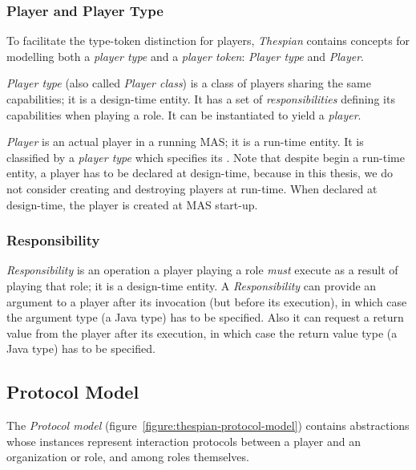 \subsubsection*{Player and Player Type}

To facilitate the type-token distinction for players, \textit{Thespian} contains concepts for modelling both a \textit{player type} and a \textit{player token}: \textit{Player type} and \textit{Player}.

\textit{Player type} (also called \textit{Player class}) is a class of players sharing the same capabilities; it is a design-time entity.
It has a set of \textit{responsibilities} defining its capabilities when playing a role.
It can be instantiated to yield a \textit{player}.

\textit{Player} is an actual player in a running MAS; it is a run-time entity.
It is classified by a \textit{player type} which specifies its .
Note that despite begin a run-time entity, a player has to be declared at design-time, because in this thesis, we do not consider creating and destroying players at run-time.
When declared at design-time, the player is created at MAS start-up.

\subsubsection*{Responsibility}

\textit{Responsibility} is an operation a player playing a role \textit{must} execute as a result of playing that role; it is a design-time entity.
A \textit{Responsibility} can provide an argument to a player after its invocation (but before its execution), in which case the argument type (a Java type) has to be specified.
Also it can request a return value from the player after its execution, in which case the return value type (a Java type) has to be specified.

\subsection{Protocol Model}

The \textit{Protocol model} (figure~\ref{figure:thespian-protocol-model}) contains abstractions whose instances represent interaction protocols between a player and an organization or role, and among roles themselves.

